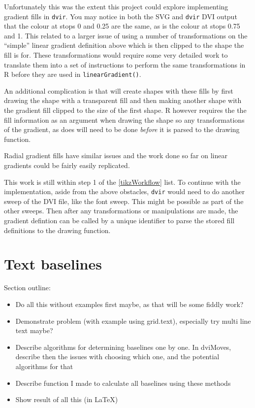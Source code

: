 \documentclass[]{article}
\begin{document}
Unfortunately this was the extent this project could explore
implementing \Tikz{} gradient fills in \texttt{dvir}. You may notice in
both the SVG and \texttt{dvir} DVI output that the colour at stops 0 and
0.25 are the same, as is the colour at stops 0.75 and 1. This related to
a larger issue of \Tikz{} using a number of transformations on the
``simple'' linear gradient definition above which is then clipped to the
shape the fill is for. These transformations would require some very
detailed work to translate them into a set of instructions to perform
the same transformations in R before they are used in
\texttt{linearGradient()}.

An additional complication is that \Tikz{} will create shapes with these
fills by first drawing the shape with a transparent fill and then making
another shape with the gradient fill clipped to the size of the first
shape. R however requires the the fill information as an argument when
drawing the shape so any transformations of the gradient, as \Tikz{}
does will need to be done \emph{before} it is parsed to the drawing
function.

Radial gradient fills have similar issues and the work done so far on
linear gradients could be fairly easily replicated.

This work is still within step 1 of the \ref{tikzWorkflow} list. To
continue with the implementation, aside from the above obstacles,
\texttt{dvir} would need to do another sweep of the DVI file, like the
font sweep. This might be possible as part of the other sweeps. Then
after any transformations or manipulations are made, the gradient
defintion can be called by a unique identifier to parse the stored fill
definitions to the drawing function.

\newpage{}

\section{Text baselines}\label{text-baselines}

Section outline:

\begin{itemize}
\item
  Do all this without examples first maybe, as that will be some fiddly
  work?
\item
  Demonstrate problem (with example using grid.text), especially try
  multi line text maybe?
\item
  Describe algorithms for determining baselines one by one. In dviMoves,
  describe then the issues with choosing which one, and the potential
  algorithms for that
\item
  Describe function I made to calculate all baselines using these
  methods
\item
  Show result of all this (in LaTeX)
\end{itemize}
\end{document}
